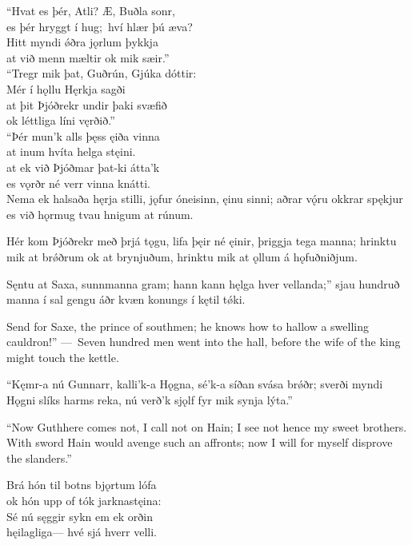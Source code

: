 \bookStart

\bva “Hvat es þér, Atli? \hld Æ, Buðla sonr, \\%
es þér hryggt í hug; \hld hví hlær þú æva? \\%
Hitt myndi ǿðra \hld jǫrlum þykkja \\%
at við menn mæltir \hld ok mik sæir.”\\%

\bva “Tregr mik þat, Guðrún, \hld Gjúka dóttir: \\%
Mér í hǫllu \hld Hęrkja sagði \\%
at þit Þjóðrekr \hld undir þaki svæfið \\%
ok léttliga \hld líni vęrðið.”\\%

\bva “Þér mun'k alls þęss \hld ęiða vinna \\%
at inum hvíta \hld helga stęini. \\%
at ek við Þjóðmar \hld þat-ki átta'k \\%
es vǫrðr né verr \hld vinna knátti.\\%

Nema ek halsaða \hld hęrja stilli,
jǫfur óneisinn, \hld ęinu sinni;
aðrar vǫ́ru \hld okkrar spękjur
es við hǫrmug tvau \hld hnigum at rúnum.

\bva Hér kom Þjóðrekr \hld með þrjá tǫgu,
lifa þęir né ęinir, \hld þriggja tega manna;
hrinktu mik at brǿðrum \hld ok at brynjuðum,
hrinktu mik at ǫllum \hld á hǫfuðniðjum.

\bva Sęntu at Saxa, \hld sunnmanna gram;
hann kann hęlga \hld hver vellanda;”
sjau hundruð manna \hld í sal gengu
áðr kvæn konungs \hld í kętil tǿki.

Send for Saxe, the prince of southmen; he knows how to hallow a swelling cauldron!” — Seven hundred men went into the hall, before the wife of the king might touch the kettle.

\bva “Kęmr-a nú Gunnarr, \hld kalli'k-a Hǫgna,
sé'k-a síðan \hld svása brǿðr;
sverði myndi Hǫgni \hld slíks harms reka,
nú verð’k sjǫlf fyr mik \hld synja lýta.”

“Now Guthhere comes not, I call not on Hain; I see not hence my sweet brothers. With sword Hain would avenge such an affronts; now I will for myself disprove the slanders.”

\bva Brá hón til botns \hld bjǫrtum lófa \\%
ok hón upp of tók \hld jarknastęina: \\%
Sé nú sęggir \hld sykn em ek orðin \\%
hęilagliga— \hld hvé sjá hverr velli.\\%

